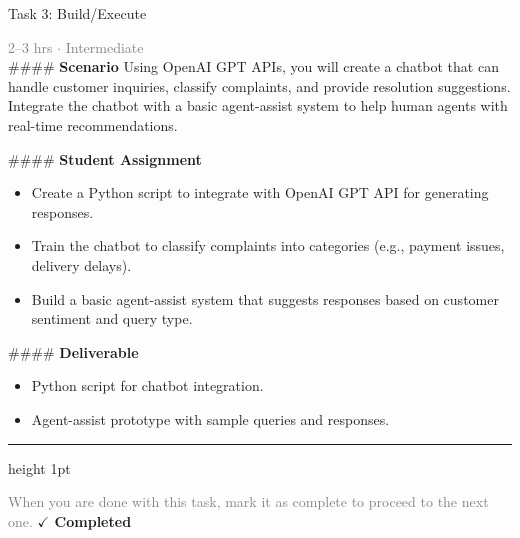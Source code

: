 \documentclass[10pt,a4paper]{article}
\begin{document}
\begin{taskbox}{Task 3: Build/Execute}

    {\small \textcolor{gray}{2--3 hrs $\cdot$ Intermediate}}\\[12pt]

    \#\#\#\# \textbf{Scenario}  
Using OpenAI GPT APIs, you will create a chatbot that can handle customer inquiries, classify complaints, and provide resolution suggestions. Integrate the chatbot with a basic agent-assist system to help human agents with real-time recommendations.  

\#\#\#\# \textbf{Student Assignment}  
\begin{itemize}
    \item Create a Python script to integrate with OpenAI GPT API for generating responses.  
    \item Train the chatbot to classify complaints into categories (e.g., payment issues, delivery delays).  
    \item Build a basic agent-assist system that suggests responses based on customer sentiment and query type.  
\end{itemize}

\#\#\#\# \textbf{Deliverable}  
\begin{itemize}
    \item Python script for chatbot integration.  
    \item Agent-assist prototype with sample queries and responses.\par
\end{itemize}

    \vspace{16pt}

    \textcolor{cardBorder}{\hrule height 1pt}\vspace{8pt}

    \small \textcolor{gray}{When you are done with this task, mark it as complete to proceed to the next one.} \hfill \textbf{\textcolor{brandDark}{$\checkmark$ Completed}}

\end{taskbox}
\end{document}
